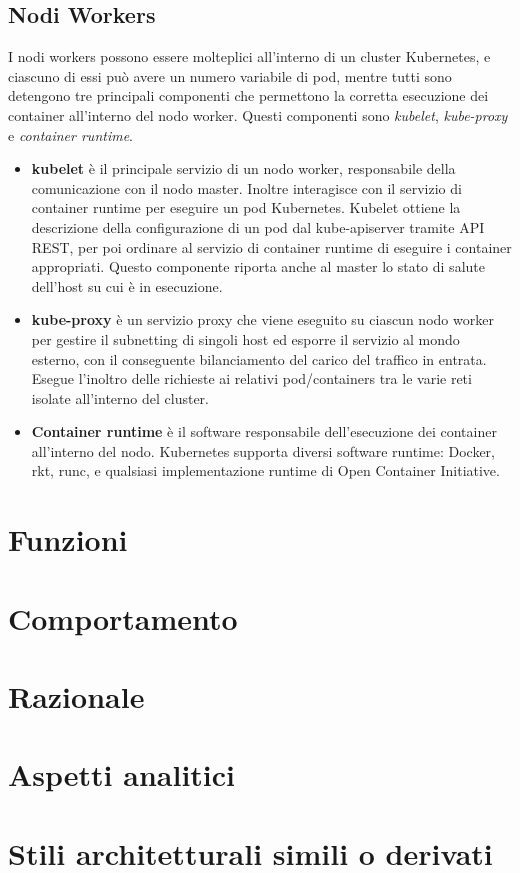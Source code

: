 \documentclass[12pt, a4paper]{report}
\begin{document}
\section{Nodi Workers}
I nodi workers possono essere molteplici all'interno di un cluster Kubernetes, e ciascuno di essi può avere un numero variabile di pod, mentre tutti sono detengono tre principali componenti che permettono la corretta esecuzione dei container all'interno del nodo worker. Questi componenti sono \textit{kubelet}, \textit{kube-proxy} e \textit{container runtime}.
\begin{itemize}
  \item \textbf{kubelet} è il principale servizio di un nodo worker, responsabile della comunicazione con il nodo master. Inoltre interagisce con il servizio di container runtime per eseguire un pod Kubernetes. Kubelet ottiene la descrizione della configurazione di un pod dal kube-apiserver tramite API REST, per poi ordinare al servizio di container runtime di eseguire i container appropriati. Questo componente riporta anche al master lo stato di salute dell'host su cui è in esecuzione.
  \item \textbf{kube-proxy} è un servizio proxy che viene eseguito su ciascun nodo worker per gestire il subnetting di singoli host ed esporre il servizio al mondo esterno, con il conseguente bilanciamento del carico del traffico in entrata. Esegue l'inoltro delle richieste ai relativi pod/containers tra le varie reti isolate all'interno del cluster.
  \item \textbf{Container runtime} è il software responsabile dell'esecuzione dei container all'interno del nodo. Kubernetes supporta diversi software runtime: Docker, rkt, runc, e qualsiasi implementazione runtime di Open Container Initiative.
\end{itemize}
\chapter{Funzioni}
\chapter{Comportamento}
\chapter{Razionale}
\chapter{Aspetti analitici}
\chapter{Stili architetturali simili o derivati}

\end{document}
